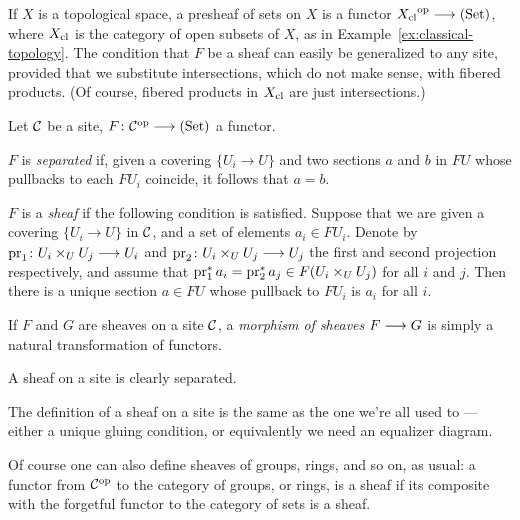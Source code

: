 \begin{2   CONTRAVARIANT FUNCTORS}
\begin{2.3 Sheaves in Grothendieck topologies}
If $X$ is a topological space, a presheaf of sets on $X$ is a functor ${X\cl}\op \arr \catset$, where $X_\mathrm{cl}$ is the category of open subsets of $X$, as in Example~\ref{ex:classical-topology}. The condition that $F$ be a sheaf can easily be generalized to any site, provided that we substitute intersections, which do not make sense, with fibered products. (Of course, fibered products in $X_\mathrm{cl}$ are just intersections.)

\begin{definition}
Let $\mathcal{C}$ be a site, $F \colon \cC\op \arr
\catset$ a functor.

\begin{enumeratei}

\item $F$ is \emph{separated}%
   if, given a covering $\{U_i \to U\}$ and two sections $a$ and $b$ in $F U$ whose pullbacks to each $F U_i$ coincide, it follows that $a = b$.

\item $F$ is a \emph{sheaf}%
 if the following condition is satisfied. Suppose that we are given a covering $\{U_i \to U\}$ in $\mathcal{C}$, and a set of elements $a_i \in F U_i$. Denote by $\pr_1 \colon U_i \times_U U_j \arr U_i$ and $\pr_2 \colon U_i \times_U U_j \arr U_j$ the first and second projection respectively, and assume that $\operatorname{pr}_1^* a_i = \operatorname{pr}_2^* a_j \in F(U_i \times_U U_j)$ for all $i$ and $j$. Then there is a unique section $a \in F U$ whose pullback to $F U_i$ is $a_i$ for all $i$.

If $F$ and $G$ are sheaves on a site $\mathcal{C}$, a \emph{morphism of sheaves}%
 $F \arr G$ is simply a natural transformation of functors.

\end{enumeratei}
\end{definition}

A sheaf on a site is clearly separated.
\begin{shaded}
The definition of a sheaf on a site is the same as the one we're all used to --- either a unique gluing condition, or equivalently we need an equalizer diagram.
\end{shaded}

Of course one can also define sheaves of groups, rings, and so on, as usual: a functor from $\mathcal{C}^{\mathrm{op}}$ to the category of groups, or rings, is a sheaf if its composite with the forgetful functor to the category of sets is a sheaf.


\end{2.3 Sheaves in Grothendieck topologies}
\end{2   CONTRAVARIANT FUNCTORS}
